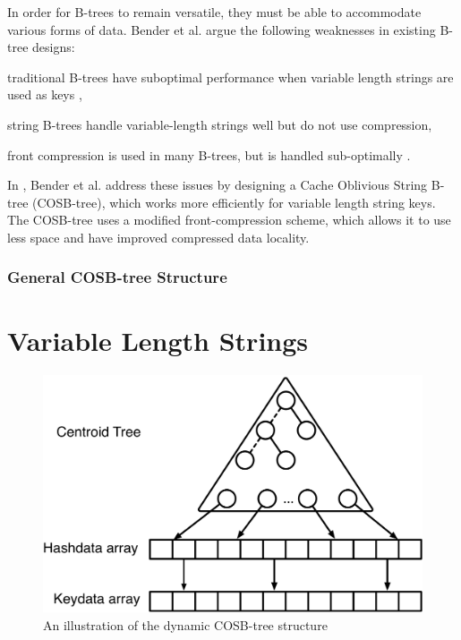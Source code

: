 \documentclass[preprint]{style}
\begin{document}
In order for B-trees to remain versatile, they must be able to accommodate
various forms of data. Bender et al. argue the following weaknesses in
existing B-tree designs: 
\begin{inparaenum}[(a)]
  \item traditional B-trees have suboptimal performance when variable length
  strings are used as keys \cite{BenderDemainColton},
  \item string B-trees \cite{Ferragina98} handle variable-length strings well
  but do not use compression, 
  \item front compression \cite{BayerUn77,ClarkSaSt69,Comer79,Wagner73} is used
  in many B-trees, but is handled sub-optimally \cite{BenderFaKu06}. 
\end{inparaenum} 

In \cite{BenderFaKu06}, Bender et al. address these issues by designing a Cache
Oblivious String B-tree (COSB-tree), which works more efficiently
for variable length string keys. The COSB-tree uses a modified front-compression
scheme, which allows it to use less space and have improved
compressed data locality.

\subsubsection{General COSB-tree Structure}

\section{Variable Length Strings}
\begin{figure}
\begin{center}
	\includegraphics[width=\columnwidth]{figures/COSB-treegeneralstructurediagram.pdf}
\end{center}
\caption{An illustration of the dynamic COSB-tree structure}
\label{fig:string_structure}
\end{figure}
\end{document}
